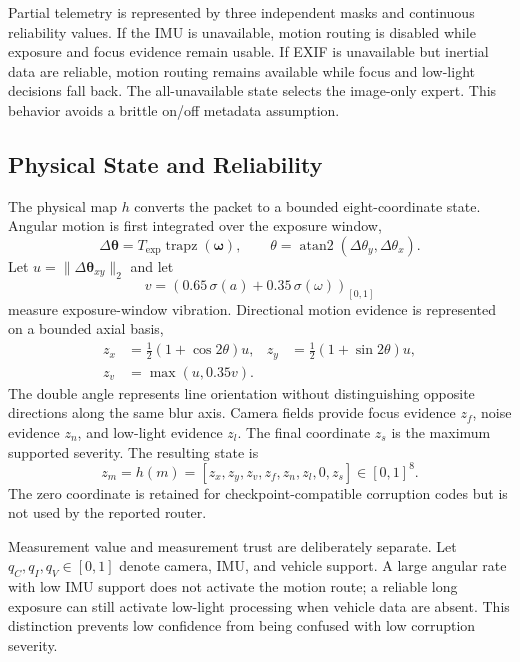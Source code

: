 \documentclass[journal]{IEEEtran}
\begin{document}
Partial telemetry is represented by three independent masks and continuous reliability values. If the IMU is unavailable, motion routing is disabled while exposure and focus evidence remain usable. If EXIF is unavailable but inertial data are reliable, motion routing remains available while focus and low-light decisions fall back. The all-unavailable state selects the image-only expert. This behavior avoids a brittle on/off metadata assumption.

\subsection{Physical State and Reliability}
The physical map $h$ converts the packet to a bounded eight-coordinate state. Angular motion is first integrated over the exposure window,
\begin{equation}
\Delta\boldsymbol{\theta}
=T_{\mathrm{exp}}\operatorname{trapz}(\boldsymbol{\omega}),
\qquad
\theta=\operatorname{atan2}(\Delta\theta_y,\Delta\theta_x).
\label{eq:integral}
\end{equation}
Let $u=\|\Delta\boldsymbol{\theta}_{xy}\|_2$ and let
\begin{equation}
v=\left(0.65\,\sigma(a)+0.35\,\sigma(\omega)\right)_{[0,1]}
\label{eq:vibration}
\end{equation}
measure exposure-window vibration. Directional motion evidence is represented on a bounded axial basis,
\begin{equation}
\begin{aligned}
z_x&=\tfrac12(1+\cos 2\theta)u, &
z_y&=\tfrac12(1+\sin 2\theta)u,\\
z_v&=\max(u,0.35v).&&
\end{aligned}
\label{eq:motionstate}
\end{equation}
The double angle represents line orientation without distinguishing opposite directions along the same blur axis. Camera fields provide focus evidence $z_f$, noise evidence $z_n$, and low-light evidence $z_l$. The final coordinate $z_s$ is the maximum supported severity. The resulting state is
\begin{equation}
z_m=h(m)=[z_x,z_y,z_v,z_f,z_n,z_l,0,z_s]\in[0,1]^8.
\label{eq:state}
\end{equation}
The zero coordinate is retained for checkpoint-compatible corruption codes but is not used by the reported router.

Measurement value and measurement trust are deliberately separate. Let $q_C,q_I,q_V\in[0,1]$ denote camera, IMU, and vehicle support. A large angular rate with low IMU support does not activate the motion route; a reliable long exposure can still activate low-light processing when vehicle data are absent. This distinction prevents low confidence from being confused with low corruption severity.
\end{document}
